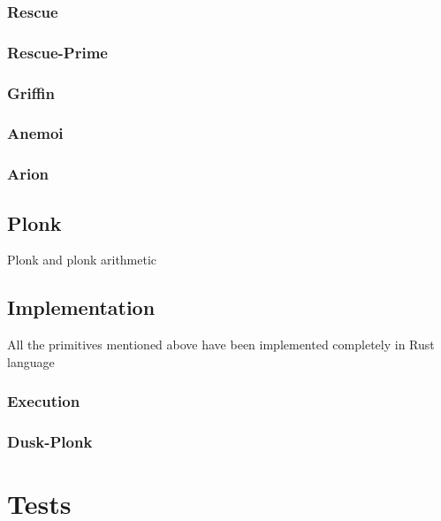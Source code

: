 \documentclass[12pt, a4paper]{report}
\begin{document}
\subsection{Rescue}\label{subsec:rescue}

\subsection{Rescue-Prime}\label{subsec:rescueprime}

\subsection{Griffin}\label{subsec:griffin}

\subsection{Anemoi}\label{subsec:anemoi}

\subsection{Arion}\label{subsec:arion}

\section{Plonk}

Plonk and plonk arithmetic

\section{Implementation}\label{sec:implementation}

All the primitives mentioned above have been implemented completely in Rust language

\subsection{Execution}\label{subsec:execution}

\subsection{Dusk-Plonk}\label{subsec:duskplonk}

\chapter{Tests}\label{chap:tests}
\end{document}
